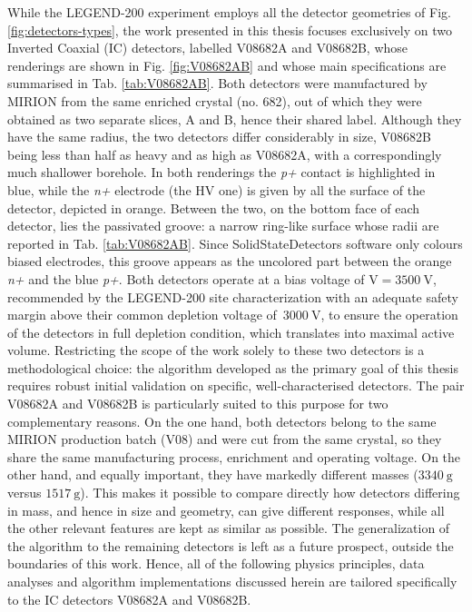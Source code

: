 While the LEGEND-200 experiment employs all the detector geometries of Fig. \ref{fig:detectors-types}, the work presented in this thesis focuses exclusively on two Inverted Coaxial (IC) detectors, labelled V08682A and V08682B, whose renderings are shown in Fig. \ref{fig:V08682AB} and whose main specifications are summarised in Tab. \ref{tab:V08682AB}. Both detectors were manufactured by MIRION from the same enriched crystal (no. 682), out of which they were obtained as two separate slices, A and B, hence their shared label. Although they have the same radius, the two detectors differ considerably in size, V08682B being less than half as heavy and as high as V08682A, with a correspondingly much shallower borehole. In both renderings the \textit{p+} contact is highlighted in blue, while the \textit{n+} electrode (the HV one) is given by all the surface of the detector, depicted in orange. Between the two, on the bottom face of each detector, lies the passivated groove: a narrow ring-like surface whose radii are reported in Tab. \ref{tab:V08682AB}. Since SolidStateDetectors software only colours biased electrodes, this groove appears as the uncolored part between the orange \textit{n+} and the blue \textit{p+}. Both detectors operate at a bias voltage of V$ = 3500~\text{V}$, recommended by the LEGEND-200 site characterization with an adequate safety margin above their common depletion voltage of~$3000~\text{V}$, to ensure the operation of the detectors in full depletion condition, which translates into maximal active volume.
Restricting the scope of the work solely to these two detectors is a methodological choice: the algorithm developed as the primary goal of this thesis requires robust initial validation on specific, well-characterised detectors. The pair V08682A and V08682B is particularly suited to this purpose for two complementary reasons. On the one hand, both detectors belong to the same MIRION production batch (V08) and were cut from the same crystal, so they share the same manufacturing process, enrichment and operating voltage. On the other hand, and equally important, they have markedly different masses ($3340~\text{g}$ versus $1517~\text{g}$). This makes it possible to compare directly how detectors differing in mass, and hence in size and geometry, can give different responses, while all the other relevant features are kept as similar as possible. The generalization of the algorithm to the remaining detectors is left as a future prospect, outside the boundaries of this work. Hence, all of the following physics principles, data analyses and algorithm implementations discussed herein are tailored specifically to the IC detectors V08682A and V08682B.

